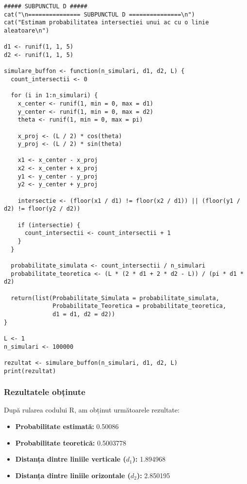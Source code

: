 \documentclass{article}
\begin{document}
\begin{lstlisting}
##### SUBPUNCTUL D #####
cat("\n=============== SUBPUNCTUL D ===============\n")
cat("Estimam probabilitatea intersectiei unui ac cu o linie aleatoare\n")

d1 <- runif(1, 1, 5)  
d2 <- runif(1, 1, 5)  

simulare_buffon <- function(n_simulari, d1, d2, L) {
  count_intersectii <- 0
  
  for (i in 1:n_simulari) {
    x_center <- runif(1, min = 0, max = d1)
    y_center <- runif(1, min = 0, max = d2)
    theta <- runif(1, min = 0, max = pi)
    
    x_proj <- (L / 2) * cos(theta)
    y_proj <- (L / 2) * sin(theta)
    
    x1 <- x_center - x_proj
    x2 <- x_center + x_proj
    y1 <- y_center - y_proj
    y2 <- y_center + y_proj
    
    intersectie <- (floor(x1 / d1) != floor(x2 / d1)) || (floor(y1 / d2) != floor(y2 / d2))
    
    if (intersectie) {
      count_intersectii <- count_intersectii + 1
    }
  }
  
  probabilitate_simulata <- count_intersectii / n_simulari
  probabilitate_teoretica <- (L * (2 * d1 + 2 * d2 - L)) / (pi * d1 * d2)
  
  return(list(Probabilitate_Simulata = probabilitate_simulata,
              Probabilitate_Teoretica = probabilitate_teoretica,
              d1 = d1, d2 = d2))
}

L <- 1   
n_simulari <- 100000 

rezultat <- simulare_buffon(n_simulari, d1, d2, L)
print(rezultat)
\end{lstlisting}

\subsubsection*{Rezultatele obținute}

După rularea codului R, am obținut următoarele rezultate:

\begin{itemize}
    \item \textbf{Probabilitate estimată:} 0.50086
    \item \textbf{Probabilitate teoretică:} 0.5003778
    \item \textbf{Distanța dintre liniile verticale (\( d_1 \)):} 1.894968
    \item \textbf{Distanța dintre liniile orizontale (\( d_2 \)):} 2.850195
\end{itemize}
\end{document}
